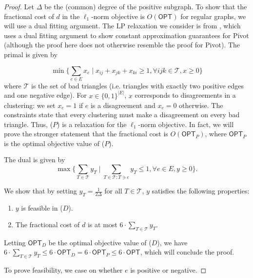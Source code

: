 \documentclass[11pt]{article}
\begin{document}
\begin{proof}
    Let $\Delta$ be the (common) degree of the positive subgraph. To show that the fractional cost of $d$ in the $\ell_1$-norm objective is $O(\textsf{OPT})$ for regular graphs, we will use a dual fitting argument. The LP relaxation we consider is from \cite{ACN-pivot}, which uses a dual fitting argument to show constant approximation guarantees for Pivot (although the proof here does not otherwise resemble the proof for Pivot). The primal is given by 

\begin{equation} \label{eq: lp_pivot} \tag{$P$}
 \min\Big\{\sum_{e \in E} x_e \mid x_{ij}+x_{jk}+x_{ki} \geq 1, \forall ijk \in \mathcal{T}, x \geq 0\Big\}
\end{equation}
where $\mathcal{T}$ is the set of bad triangles (i.e. triangles with exactly two positive edges and one negative edge). For $x \in \{0,1\}^{|E|}$, $x$ corresponds to disagreements in a clustering: we set $x_e = 1$ if $e$ is a disagreement and $x_e = 0$ otherwise. The constraints state that every clustering must make a disagreement on every bad triangle. Thus, ($P$) is a relaxation for the $\ell_1$-norm objective. In fact, we will prove the stronger statement that the fractional cost is $O(\textsf{OPT}_{P})$, where $\textsf{OPT}_{P}$ is the optimal objective value of ($P$). 

The dual is given by 
\begin{equation} \label{eq: dual_pivot} \tag{$D$}
\max\Big\{\sum_{T \in \mathcal{T}}y_T \mid \sum_{T \in \mathcal{T}: T \ni e} y_T \leq 1, \forall e \in E, y \geq 0 \Big\}.
\end{equation}

We show that by setting $y_T = \frac{1}{2\Delta}$ for all $T \in \mathcal{T}$, $y$ satisfies the following properties:
\begin{enumerate}
    \item $y$ is feasible in ($D$).
    \item The fractional cost of $d$ is at most $6 \cdot \sum_{T \in \mathcal{T}} y_T$.
\end{enumerate}

Letting $\textsf{OPT}_D$ be the optimal objective value of ($D$), we have $6 \cdot \sum_{T \in \mathcal{T}} y_T \leq 6 \cdot \textsf{OPT}_D = 6 \cdot \textsf{OPT}_{P} \leq 6 \cdot \textsf{OPT}$, which will conclude the proof.

To prove feasibility, we case on whether $e$ is positive or negative. 


\end{proof}
\end{document}
